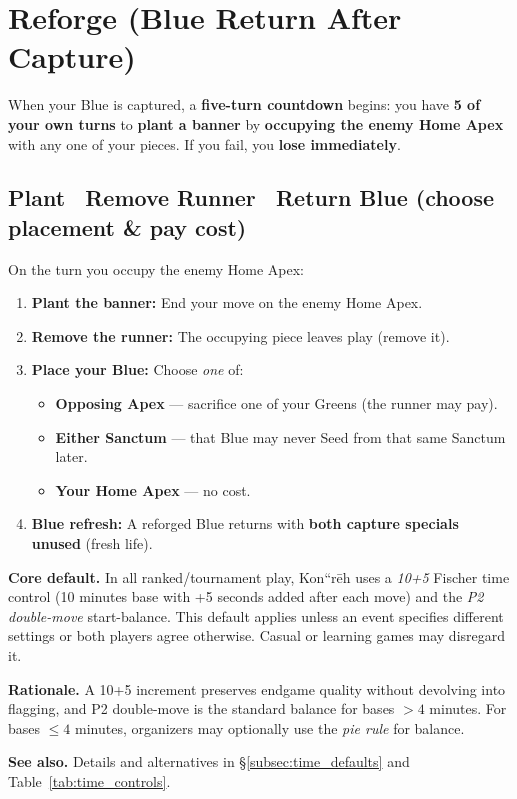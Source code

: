 \documentclass[11pt]{article}
\begin{document}
\section{Reforge (Blue Return After Capture)}\label{sec:reforge}
When your Blue is captured, a \textbf{five-turn countdown} begins: you have \textbf{5 of your own turns} to \textbf{plant a banner} by \textbf{occupying the enemy Home Apex} with any one of your pieces. If you fail, you \textbf{lose immediately}.

\subsection*{Plant \textrightarrow\ Remove Runner \textrightarrow\ Return Blue (choose placement & pay cost)}
On the turn you occupy the enemy Home Apex:
\begin{enumerate}
  \item \textbf{Plant the banner:} End your move on the enemy Home Apex.
  \item \textbf{Remove the runner:} The occupying piece leaves play (remove it).
  \item \textbf{Place your Blue:} Choose \emph{one} of:
  \begin{itemize}
     \item \textbf{Opposing Apex} --- sacrifice one of your Greens (the runner may pay).
     \item \textbf{Either Sanctum} --- that Blue may never Seed from that same Sanctum later.
  \item \textbf{Your Home Apex} --- no cost.
  \end{itemize}
  \item \textbf{Blue refresh:} A reforged Blue returns with \textbf{both capture specials unused} (fresh life).
\end{enumerate}

\begin{tcolorbox}[title={Default Time \& Start-Balance Rule},label={box:default_time_rule},breakable]
\textbf{Core default.} In all ranked/tournament play, Kon``rēh uses a \emph{10+5} Fischer time control
(10 minutes base with +5 seconds added after each move) and the \emph{P2 double-move} start-balance.
This default applies unless an event specifies different settings or both players agree otherwise.
Casual or learning games may disregard it.

\textbf{Rationale.} A 10+5 increment preserves endgame quality without devolving into flagging,
and P2 double-move is the standard balance for bases $>4$ minutes. For bases $\leq 4$ minutes,
organizers may optionally use the \emph{pie rule} for balance.

\textbf{See also.} Details and alternatives in \S\ref{subsec:time_defaults} and Table~\ref{tab:time_controls}.
\end{tcolorbox}
\end{document}
